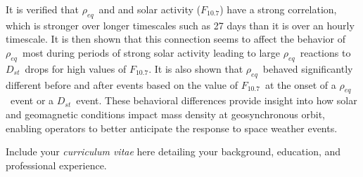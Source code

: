 \documentclass[11 pt]{GMUDissertation}
\newcommand{\req}{\ensuremath{\rho_{eq}}} %
\newcommand{\dst}{\ensuremath{D_{st}}} %
\newcommand{\f}{\ensuremath{F_{10.7}}} %
\begin{document}
%

\abstractmultiplepage

It is verified that \req\ and and solar activity (\f) have a strong correlation, which is stronger over longer timescales such as 27 days than it is over an hourly timescale. It is then shown that this connection seems to affect the behavior of \req\ most during periods of strong solar activity leading to large \req\ reactions to \dst\ drops for high values of \f.  It is also shown that \req\ behaved significantly different before and after events based on the value of \f\ at the onset of a \req\ event or a \dst\ event. These behavioral differences provide insight into how solar and geomagnetic conditions impact mass density at geosynchronous orbit, enabling operators to better anticipate the response to space weather events.
%
\startofchapters








\appendix
\appendixeqnumbering





%



\cvpage

\noindent Include your \emph{curriculum vitae} here detailing your background,
education, and professional experience.
\end{document}
